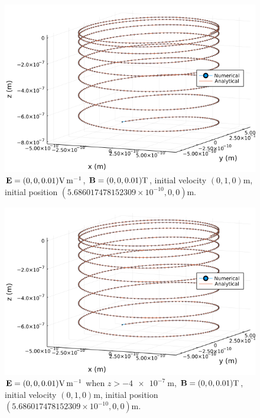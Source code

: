 \documentclass[twoside]{article}
\begin{document}
\begin{figure}
  \centering
  \includegraphics[width=\textwidth]{Econst_Bconst.png}
  \caption{$\vb{E}=(0,0,0.01)\si{\volt\per\metre}$, $\vb{B}=(0,0,0.01)\si{\tesla}$, initial velocity $(0, 1, 0)\si{\metre}$, initial position $(5.686017478152309\times10^{-10}, 0, 0)\si{\metre}$.}
  \label{fig: E const B const}
\end{figure}
\begin{figure}
  \centering
  \includegraphics[width=\textwidth]{Epartial_Bconst.png}
  \caption{$\vb{E}=(0,0,0.01)\si{\volt\per\metre}$ when $z>\SI{-4e-7}{\metre}$, $\vb{B}=(0,0,0.01)\si{\tesla}$, initial velocity $(0, 1, 0)\si{\metre}$, initial position $(5.686017478152309\times10^{-10}, 0, 0)\si{\metre}$.}
  \label{fig: E partial B const}
\end{figure}

\printbibliography


\end{document}
